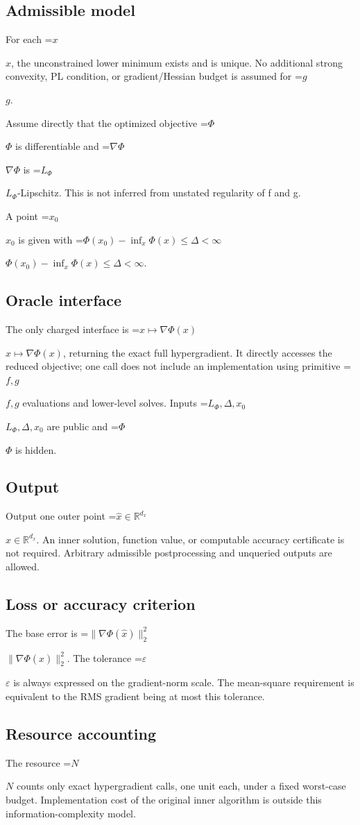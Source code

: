 \documentclass[10pt,a4paper]{article}
\newcommand{\AtlasMath}[1]{\par\begingroup\centering\setbox0=\hbox{$\displaystyle #1$}\ifdim\wd0>1.4\linewidth\typeout{ATLAS WIDE FORMULA: \the\wd0}\fi\ifdim\wd0>\linewidth\resizebox{\linewidth}{!}{\box0}\else\box0\fi\par\endgroup}
\newcommand{\AtlasInlineMath}[1]{\begingroup\setbox0=\hbox{$#1$}\ifdim\wd0>.4\linewidth\endgroup\AtlasMath{#1}\else\endgroup$#1$\fi}
\begin{document}
\subsection{Admissible model}
For each \AtlasInlineMath{x}, the unconstrained lower minimum exists and is unique. No additional strong convexity, PL condition, or gradient/Hessian budget is assumed for \AtlasInlineMath{g}.

Assume directly that the optimized objective \AtlasInlineMath{\Phi} is differentiable and \AtlasInlineMath{\nabla\Phi} is \AtlasInlineMath{L_\Phi}-Lipschitz. This is not inferred from unstated regularity of f and g.

A point \AtlasInlineMath{x_0} is given with \AtlasInlineMath{\Phi(x_0)-\inf_x\Phi(x)\le\Delta<\infty}.

\subsection{Oracle interface}
The only charged interface is \AtlasInlineMath{x\mapsto\nabla\Phi(x)}, returning the exact full hypergradient. It directly accesses the reduced objective; one call does not include an implementation using primitive \AtlasInlineMath{f,g} evaluations and lower-level solves. Inputs \AtlasInlineMath{L_\Phi,\Delta,x_0} are public and \AtlasInlineMath{\Phi} is hidden.

\subsection{Output}
Output one outer point \AtlasInlineMath{\widehat{x}\in\mathbb{R}^{d_x}}. An inner solution, function value, or computable accuracy certificate is not required. Arbitrary admissible postprocessing and unqueried outputs are allowed.

\subsection{Loss or accuracy criterion}
The base error is \AtlasInlineMath{\|\nabla\Phi(\widehat{x})\|_2^2}. The tolerance \AtlasInlineMath{\varepsilon} is always expressed on the gradient-norm scale. The mean-square requirement is equivalent to the RMS gradient being at most this tolerance.

\subsection{Resource accounting}
The resource \AtlasInlineMath{N} counts only exact hypergradient calls, one unit each, under a fixed worst-case budget. Implementation cost of the original inner algorithm is outside this information-complexity model.
\end{document}
